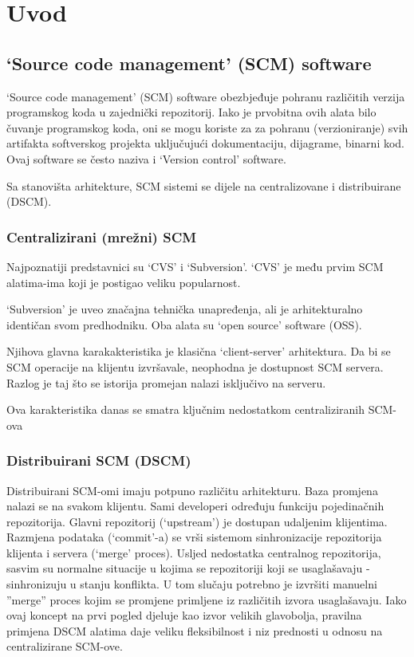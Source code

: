 \documentclass[times, utf8, seminar]{fit}
\begin{document}

\chapter{Uvod}
\vspace*{-0.7cm}

\section{`Source code management' (SCM) software}

`Source code management' (SCM) software obezbjeđuje pohranu različitih verzija programskog koda u zajednički repozitorij. 
Iako je prvobitna ovih alata bilo čuvanje programskog koda, oni se mogu koriste za za pohranu (verzioniranje) svih artifakta softverskog projekta uključujući dokumentaciju, dijagrame, binarni kod.
Ovaj software se često naziva i `Version control' software.

Sa stanovišta arhitekture, SCM sistemi se dijele na centralizovane i distribuirane (DSCM).

\subsection{Centralizirani (mrežni) SCM}

Najpoznatiji predstavnici su `CVS' i `Subversion'. `CVS' je među prvim SCM alatima-ima koji je postigao veliku popularnost.

`Subversion' je uveo značajna tehnička unapređenja, ali je arhitekturalno identičan svom predhodniku. Oba alata su `open source' software (OSS).

Njihova glavna karakakteristika je klasična `client-server' arhitektura. Da bi se SCM operacije na klijentu izvršavale, neophodna je dostupnost SCM servera.
Razlog je taj što se istorija promejan nalazi isključivo na serveru.

Ova karakteristika danas se smatra ključnim nedostatkom centraliziranih SCM-ova

\subsection{Distribuirani SCM (DSCM)}

Distribuirani SCM-omi imaju potpuno različitu arhitekturu. Baza promjena nalazi se na svakom klijentu.
Sami developeri određuju funkciju pojedinačnih repozitorija. Glavni repozitorij (`upstream') je dostupan udaljenim klijentima.
Razmjena podataka (`commit'-a) se vrši sistemom sinhronizacije repozitorija klijenta i servera (`merge' proces). 
Usljed nedostatka centralnog repozitorija, sasvim su normalne situacije u kojima se repozitoriji koji se usaglašavaju - sinhronizuju u stanju konflikta.
U tom slučaju potrebno je izvršiti manuelni ''merge'' proces kojim se promjene primljene iz različitih izvora usaglašavaju.
Iako ovaj koncept na prvi pogled djeluje kao izvor velikih glavobolja, pravilna primjena DSCM alatima daje veliku fleksibilnost i niz prednosti u odnosu na centralizirane SCM-ove.
\end{document}
